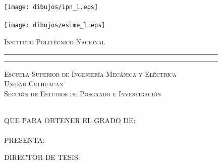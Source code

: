 \begin{figure}[h]
\hskip-0.5cm
\begin{minipage}[c][18cm][s]{2cm}
  \begin{center}
    \texttt{[image: dibujos/ipn\_l.eps]}\\[5pt]
    \hskip2pt\vrule width2pt height14cm\hskip1mm
    \vrule width1pt height14cm\\[5pt]
    \texttt{[image: dibujos/esime\_l.eps]}
  \end{center}
\end{minipage}\quad
\begin{minipage}[c][20cm][s]{12cm}
  \begin{center}
      \vspace{1cm}
    {\Large \scshape Instituto Polit\'ecnico Nacional}
    \vspace{8pt}
    \hrule height2pt
    \vspace{.1cm}
    \hrule height1pt
    \vspace{.3cm}
    {\scshape Escuela Superior de Ingenier\'ia Mec\'anica y El\'ectrica\\Unidad Culhuacan\\[16pt]
    Secci\'on de Estudios de Posgrado e Investigaci\'on}

    \vspace{62pt}

    {\Large \eltitulo}

    \vspace{62pt}

    \\[32pt]
    {\small QUE PARA OBTENER EL GRADO DE:}\\ [4pt]
    \mbox{}{\large \lacarrera}\\[32pt]
    PRESENTA:\\[4pt]
    {\large \elnombre}

    \vspace{32pt}

    {\small DIRECTOR DE TESIS:\\[4pt]{\large \eldirector}}

    \vspace{32pt}

    \lafecha

  \end{center}
\end{minipage}
\end{figure}

